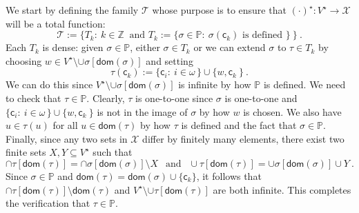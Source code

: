 \documentclass[10pt,a4paper, openany,  oldfontcommands]{memoir}
\newtheorem{open problem} [theorem] {Open Problem}
\begin{document}
  We start by defining  the family  $  \mathcal{T}  $ whose purpose is to ensure that 
 $  (  \cdot )^{  \star }   :  V^{  \star }     \to        \mathcal{X}   $
 will be a total function: 
 \[
  \mathcal{T}    :=  \Big\{   T_k   :   \    k \in   \mathbb{Z}     \  \mbox{ and  }   
  T_k :=  \big\{  \sigma   \in \mathbb{P}  :   \    \sigma  \left(    \mathsf{c}_k  \right)    \mbox{ is defined } \big\}
  \    \Big\} 
  \        .
 \]
Each   $  T_k    $  is dense:  given  $  \sigma  \in \mathbb{P} $, 
either  $  \sigma  \in T_k  $  or we can extend $  \sigma  $  to   $  \tau  \in  T_k  $  by 
choosing  $ w   \in   V^{  \star }   \setminus   \cup  \sigma  \left[  \mathsf{dom} \left(   \sigma  \right)  \right]  $
and   setting      
\[
  \tau  \left(    \mathsf{c}_k  \right) :=  
   \lbrace   \mathsf{c}_i  :   \   i  \in  \omega   \,   \rbrace  \cup     \lbrace   w  ,    \mathsf{c}_k     \    \rbrace 
 \       .
 \]  
We can do this since   $  V^{  \star }   \setminus   \cup   \sigma  \left[  \mathsf{dom} \left(   \sigma  \right)  \right]    $   is infinite by how  $  \mathbb{P} $  is defined. 
We need to check that  $  \tau  \in  \mathbb{P} $. 
Clearly,  $  \tau $  is one-to-one since  $  \sigma $ is one-to-one and   $    \lbrace   \mathsf{c}_i  :   \   i  \in  \omega   \,   \rbrace  \cup     \lbrace   w  ,    \mathsf{c}_k     \    \rbrace   $  is not in the image of $  \sigma $  by how $w $  is chosen. 
We also have  $  u \in  \tau (u ) $  for all  $  u \in \mathsf{dom} \left(  \tau \right) $  by how  $  \tau $  is defined and the fact that $  \sigma  \in  \mathbb{P} $. 
Finally, since any two sets in $  \mathcal{X} $  differ by finitely many elements, 
there exist two finite sets  $  X , Y  \subseteq   V^{  \star }  $  such that  
\[
\cap   \tau   \left[   \mathsf{dom} \left(  \tau \right)   \right]   =    
  \cap   \sigma   \left[   \mathsf{dom} \left(  \sigma \right)   \right]   \setminus    X  
\       \     \mbox{  and   }      \     \  
\cup   \tau   \left[   \mathsf{dom} \left(  \tau \right)   \right]    =    
\cup   \sigma   \left[   \mathsf{dom} \left(  \sigma \right)   \right]   \cup   Y    
\      .
\]
Since  $  \sigma   \in  \mathbb{P} $ and 
 $   \mathsf{dom} \left(  \tau \right)   =   \mathsf{dom} \left(  \sigma \right)    \cup  \lbrace   \mathsf{c}_k  \rbrace   $, 
it follows that  
$  \cap   \tau   \left[   \mathsf{dom} \left(  \tau \right)   \right]   \setminus   \mathsf{dom} \left(  \tau \right)   $  
and  $  V^{  \star }  \setminus  \cup   \tau   \left[   \mathsf{dom} \left(  \tau \right)   \right]    $  are both infinite. 
This completes the verification that $  \tau  \in  \mathbb{P} $. 
\end{document}
